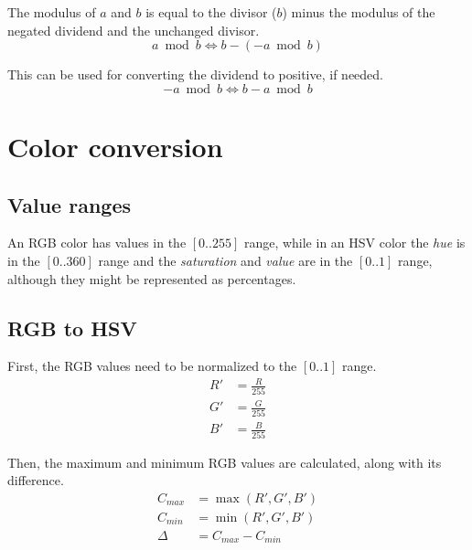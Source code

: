 \documentclass{amsart}
\begin{document}
\bigskip

The modulus of $a$ and $b$ is equal to the divisor ($b$) minus the modulus of
the negated dividend and the unchanged divisor.
\begin{equation*}
  a \bmod b \iff b - (-a \bmod b)
\end{equation*}

This can be used for converting the dividend to positive, if needed.
\begin{equation*}
  -a \bmod b \iff b - a \bmod b
\end{equation*}

\newpage
\section{Color conversion}

\subsection{Value ranges}

An RGB color has values in the $[0..255]$ range, while in an HSV color the
\textit{hue} is in the $[0..360]$ range and the \textit{saturation} and
\textit{value} are in the $[0..1]$ range, although they might be represented as
percentages.

\subsection{RGB to HSV}

First, the RGB values need to be normalized to the $[0..1]$ range.
\begin{align*}
  R' &= \frac{R}{255} \\
  G' &= \frac{G}{255} \\
  B' &= \frac{B}{255}
\end{align*}

Then, the maximum and minimum RGB values are calculated, along with its
difference.
\begin{align*}
  C_{max} &= \max(R', G', B') \\
  C_{min} &= \min(R', G', B') \\
  \Delta  &= C_{max} - C_{min}
\end{align*}
\end{document}
